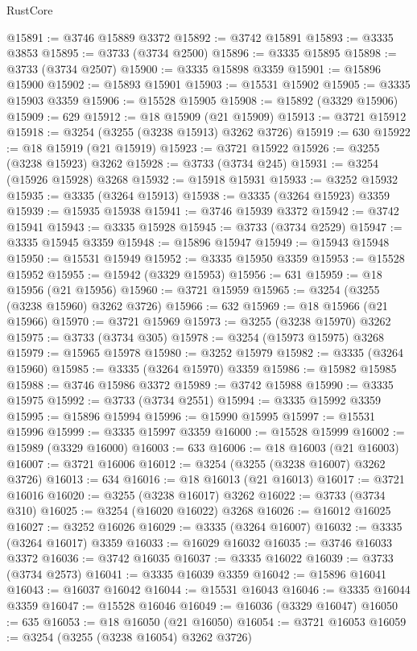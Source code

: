 \begin{lexlean}{RustCore}
\begin{coremodule}
@15891 := @3746 @15889 @3372
@15892 := @3742 @15891
@15893 := @3335 @3853
@15895 := @3733 (@3734 @2500)
@15896 := @3335 @15895
@15898 := @3733 (@3734 @2507)
@15900 := @3335 @15898 @3359
@15901 := @15896 @15900
@15902 := @15893 @15901
@15903 := @15531 @15902
@15905 := @3335 @15903 @3359
@15906 := @15528 @15905
@15908 := @15892 (@3329 @15906)
@15909 := 629
@15912 := @18 @15909 (@21 @15909)
@15913 := @3721 @15912
@15918 := @3254 (@3255 (@3238 @15913) @3262 @3726)
@15919 := 630
@15922 := @18 @15919 (@21 @15919)
@15923 := @3721 @15922
@15926 := @3255 (@3238 @15923) @3262
@15928 := @3733 (@3734 @245)
@15931 := @3254 (@15926 @15928) @3268
@15932 := @15918 @15931
@15933 := @3252 @15932
@15935 := @3335 (@3264 @15913)
@15938 := @3335 (@3264 @15923) @3359
@15939 := @15935 @15938
@15941 := @3746 @15939 @3372
@15942 := @3742 @15941
@15943 := @3335 @15928
@15945 := @3733 (@3734 @2529)
@15947 := @3335 @15945 @3359
@15948 := @15896 @15947
@15949 := @15943 @15948
@15950 := @15531 @15949
@15952 := @3335 @15950 @3359
@15953 := @15528 @15952
@15955 := @15942 (@3329 @15953)
@15956 := 631
@15959 := @18 @15956 (@21 @15956)
@15960 := @3721 @15959
@15965 := @3254 (@3255 (@3238 @15960) @3262 @3726)
@15966 := 632
@15969 := @18 @15966 (@21 @15966)
@15970 := @3721 @15969
@15973 := @3255 (@3238 @15970) @3262
@15975 := @3733 (@3734 @305)
@15978 := @3254 (@15973 @15975) @3268
@15979 := @15965 @15978
@15980 := @3252 @15979
@15982 := @3335 (@3264 @15960)
@15985 := @3335 (@3264 @15970) @3359
@15986 := @15982 @15985
@15988 := @3746 @15986 @3372
@15989 := @3742 @15988
@15990 := @3335 @15975
@15992 := @3733 (@3734 @2551)
@15994 := @3335 @15992 @3359
@15995 := @15896 @15994
@15996 := @15990 @15995
@15997 := @15531 @15996
@15999 := @3335 @15997 @3359
@16000 := @15528 @15999
@16002 := @15989 (@3329 @16000)
@16003 := 633
@16006 := @18 @16003 (@21 @16003)
@16007 := @3721 @16006
@16012 := @3254 (@3255 (@3238 @16007) @3262 @3726)
@16013 := 634
@16016 := @18 @16013 (@21 @16013)
@16017 := @3721 @16016
@16020 := @3255 (@3238 @16017) @3262
@16022 := @3733 (@3734 @310)
@16025 := @3254 (@16020 @16022) @3268
@16026 := @16012 @16025
@16027 := @3252 @16026
@16029 := @3335 (@3264 @16007)
@16032 := @3335 (@3264 @16017) @3359
@16033 := @16029 @16032
@16035 := @3746 @16033 @3372
@16036 := @3742 @16035
@16037 := @3335 @16022
@16039 := @3733 (@3734 @2573)
@16041 := @3335 @16039 @3359
@16042 := @15896 @16041
@16043 := @16037 @16042
@16044 := @15531 @16043
@16046 := @3335 @16044 @3359
@16047 := @15528 @16046
@16049 := @16036 (@3329 @16047)
@16050 := 635
@16053 := @18 @16050 (@21 @16050)
@16054 := @3721 @16053
@16059 := @3254 (@3255 (@3238 @16054) @3262 @3726)

\end{coremodule}
\end{lexlean}
